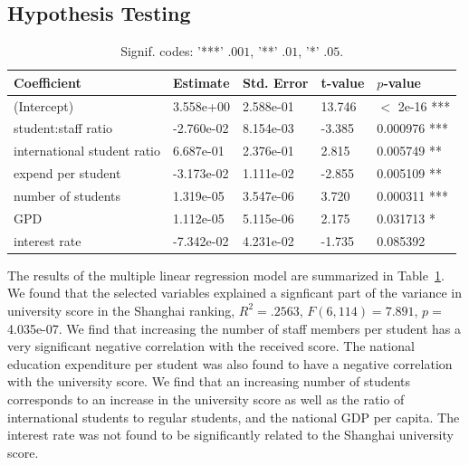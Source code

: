 \documentclass{stats_apa_style2}
\begin{document}
\subsection*{Hypothesis Testing}

\begin{table}
\centering
\begin{tabular}{lllll}
\hline
Coefficient & Estimate & Std. Error & t-value & $p$-value \\ 
\hline
(Intercept)                &  3.558e+00 & 2.588e-01 & 13.746 & $<$ 2e-16 *** \\
student:staff ratio        & -2.760e-02 & 8.154e-03 & -3.385 &0.000976 *** \\
international student ratio&  6.687e-01 & 2.376e-01 &  2.815 &0.005749 **  \\
expend per student       & -3.173e-02 & 1.111e-02 & -2.855& 0.005109 **  \\
number of students              &  1.319e-05 & 3.547e-06 &  3.720 &0.000311 *** \\
GPD                       &   1.112e-05 & 5.115e-06 &  2.175&0.031713 *   \\
interest rate                    & -7.342e-02 & 4.231e-02 & -1.735& 0.085392  \\
\hline		
\end{tabular}
\caption{Signif. codes: '***' $.001$, '**' $.01$, '*' $.05$.}
\label{table:lm}
\end{table}

The results of the multiple linear regression model are summarized in
Table~\ref{table:lm}. We found that the selected variables explained a
signficant part of the variance in university score in the Shanghai ranking,
$R^2 = .2563$, $F(6, 114) = 7.891$, $p = $ 4.035e-07. We find that increasing
the number of staff members per student has a very significant negative correlation
with the received score. The national education expenditure per student was also
found to have a negative correlation with the university score. We find that an
increasing number of students corresponds to an increase in the university score
as well as the ratio of international students to regular students, and the
national GDP per capita. The interest rate was not found to be significantly
related to the Shanghai university score.
\end{document}
